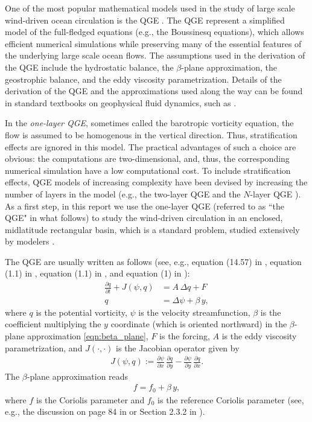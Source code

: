 One of the most popular mathematical models used in the study of large scale wind-driven ocean
circulation is the QGE \cite{Cushman11,Vallis06}. The QGE represent a simplified model of the
full-fledged equations (e.g., the Boussinesq equations), which allows efficient numerical
simulations while preserving many of the essential features of the underlying large scale ocean
flows. The assumptions used in the derivation of the QGE include the hydrostatic balance, the
$\beta$-plane approximation, the geostrophic balance, and the eddy viscosity parametrization.
Details of the derivation of the QGE and the approximations used along the way can be found in
standard textbooks on geophysical fluid dynamics, such as
\cite{Cushman11,Majda,Majda03,McWilliams06,Pedlosky92,Vallis06}. 

In the \emph{one-layer QGE}, sometimes called the barotropic vorticity equation, the flow is assumed
to be homogenous in the vertical direction. Thus, stratification effects are ignored in this model.
The practical advantages of such a choice are obvious: the computations are two-dimensional, and,
thus, the corresponding numerical simulation have a low computational cost. To include
stratification effects, QGE models of increasing complexity have been devised by increasing the
number of layers in the model (e.g., the two-layer QGE and the $N$-layer QGE \cite{Vallis06}). As a
first step, in this report we use the one-layer QGE (referred to as ``the QGE" in what follows) to
study the wind-driven circulation in an enclosed, midlatitude rectangular basin, which is a standard
problem, studied extensively by modelers \cite{Cushman11, Layton08, Majda03, Majda, McWilliams06,
Vallis06, Pedlosky92}. 

The QGE are usually written as follows (see, e.g., equation (14.57) in \cite{Vallis06}, equation
(1.1) in \cite{Majda}, equation (1.1) in \cite{Wang94}, and equation (1) in \cite{Greatbatch00}): 
\begin{align}
  \frac{\partial q}{\partial t} + J(\psi , q) &= A \, \Delta q + F
    \label{qge_q_psi_dim_1} \\
  q &= \Delta \psi + \beta \, y , \label{qge_q_psi_dim_2}
\end{align}
where $q$ is the potential vorticity, $\psi$ is the velocity streamfunction, $\beta$ is the
coefficient multiplying the $y$ coordinate (which is oriented northward) in the $\beta$-plane
approximation \eqref{eqn:beta_plane}, $F$ is the forcing, $A$ is the eddy viscosity parametrization,
and $J(\cdot , \cdot)$ is the Jacobian operator given by
\begin{align}
  J(\psi , q) := \frac{\partial \psi}{\partial x} \, \frac{\partial q}{\partial y} -
    \frac{\partial \psi}{\partial y} \, \frac{\partial q}{\partial x} . \label{eqn:jacobian}
\end{align}
The $\beta$-plane approximation reads
\begin{align}
  f = f_0 + \beta \, y , \label{eqn:beta_plane}
\end{align}
where $f$ is the Coriolis parameter and $f_0$ is the reference Coriolis parameter (see, e.g., the
discussion on page 84 in \cite{Cushman94} or Section 2.3.2 in \cite{Vallis06}).

